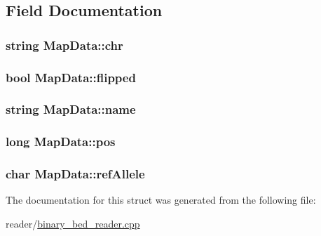 \subsection{Field Documentation}
\hypertarget{structMapData_a3d422e5b31b80cc7c4538a68af566574}{
\subsubsection[{chr}]{\setlength{\rightskip}{0pt plus 5cm}string {\bf MapData::chr}}}
\label{structMapData_a3d422e5b31b80cc7c4538a68af566574}
\hypertarget{structMapData_a72b529932979ffbcda46669cb342a4c8}{
\subsubsection[{flipped}]{\setlength{\rightskip}{0pt plus 5cm}bool {\bf MapData::flipped}}}
\label{structMapData_a72b529932979ffbcda46669cb342a4c8}
\hypertarget{structMapData_ad4f885d78b08c2cf7bab7b75a014eb94}{
\subsubsection[{name}]{\setlength{\rightskip}{0pt plus 5cm}string {\bf MapData::name}}}
\label{structMapData_ad4f885d78b08c2cf7bab7b75a014eb94}
\hypertarget{structMapData_a39c0ddcd241418ae2cb9c768e542b16f}{
\subsubsection[{pos}]{\setlength{\rightskip}{0pt plus 5cm}long {\bf MapData::pos}}}
\label{structMapData_a39c0ddcd241418ae2cb9c768e542b16f}
\hypertarget{structMapData_a26658a6770ee7316368ebcaaf6d9e9e5}{
\subsubsection[{refAllele}]{\setlength{\rightskip}{0pt plus 5cm}char {\bf MapData::refAllele}}}
\label{structMapData_a26658a6770ee7316368ebcaaf6d9e9e5}


The documentation for this struct was generated from the following file:\begin{DoxyCompactItemize}
\item 
reader/\hyperlink{binary__bed__reader_8cpp}{binary\_\-bed\_\-reader.cpp}\end{DoxyCompactItemize}
